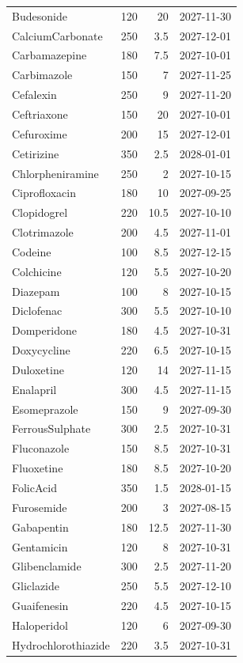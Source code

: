 \documentclass[12pt]{article}
\begin{document}
\begin{longtable}{lrrl}
Budesonide & 120 & 20 & 2027-11-30 \\
CalciumCarbonate & 250 & 3.5 & 2027-12-01 \\
Carbamazepine & 180 & 7.5 & 2027-10-01 \\
Carbimazole & 150 & 7 & 2027-11-25 \\
Cefalexin & 250 & 9 & 2027-11-20 \\
Ceftriaxone & 150 & 20 & 2027-10-01 \\
Cefuroxime & 200 & 15 & 2027-12-01 \\
Cetirizine & 350 & 2.5 & 2028-01-01 \\
Chlorpheniramine & 250 & 2 & 2027-10-15 \\
Ciprofloxacin & 180 & 10 & 2027-09-25 \\
Clopidogrel & 220 & 10.5 & 2027-10-10 \\
Clotrimazole & 200 & 4.5 & 2027-11-01 \\
Codeine & 100 & 8.5 & 2027-12-15 \\
Colchicine & 120 & 5.5 & 2027-10-20 \\
Diazepam & 100 & 8 & 2027-10-15 \\
Diclofenac & 300 & 5.5 & 2027-10-10 \\
Domperidone & 180 & 4.5 & 2027-10-31 \\
Doxycycline & 220 & 6.5 & 2027-10-15 \\
Duloxetine & 120 & 14 & 2027-11-15 \\
Enalapril & 300 & 4.5 & 2027-11-15 \\
Esomeprazole & 150 & 9 & 2027-09-30 \\
FerrousSulphate & 300 & 2.5 & 2027-10-31 \\
Fluconazole & 150 & 8.5 & 2027-10-31 \\
Fluoxetine & 180 & 8.5 & 2027-10-20 \\
FolicAcid & 350 & 1.5 & 2028-01-15 \\
Furosemide & 200 & 3 & 2027-08-15 \\
Gabapentin & 180 & 12.5 & 2027-11-30 \\
Gentamicin & 120 & 8 & 2027-10-31 \\
Glibenclamide & 300 & 2.5 & 2027-11-20 \\
Gliclazide & 250 & 5.5 & 2027-12-10 \\
Guaifenesin & 220 & 4.5 & 2027-10-15 \\
Haloperidol & 120 & 6 & 2027-09-30 \\
Hydrochlorothiazide & 220 & 3.5 & 2027-10-31 \\

\end{longtable}
\end{document}
